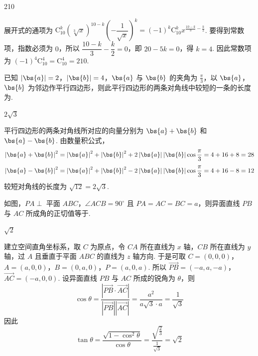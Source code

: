\begin{answer}
210
\end{answer}

\begin{solution}
展开式的通项为 \(\mathrm C_{10}^{k}\left(\sqrt[3]{x}\right)^{10-k}\left(-\dfrac{1}{\sqrt{x}}\right)^k=(-1)^k\mathrm C_{10}^{k}x^{\frac{10-k}{3}-\frac{k}{2}}\). 要得到常数项，指数必须为 \(0\)，所以 \(\dfrac{10-k}{3}-\dfrac{k}{2}=0\)，即 \(20-5k=0\)，得 \(k=4\). 因此常数项为 \((-1)^4\mathrm C_{10}^{4}=\mathrm C_{10}^{4}=210\).
\end{solution}

\begin{problem}
已知 \(\left|\bs{a}\right| = 2\)，\(\left|\bs{b}\right| = 4\)，\(\bs{a}\) 与 \(\bs{b}\) 的夹角为 \( \frac{\pi}{3} \)，以 \(\bs{a}\)，\(\bs{b}\) 为邻边作平行四边形，则此平行四边形的两条对角线中较短的一条的长度为\fillinblank{}.
\end{problem}

\begin{answer}
\(2\sqrt{3}\)
\end{answer}

\begin{solution}
平行四边形的两条对角线所对应的向量分别为 \(\bs{a}+\bs{b}\) 和 \(\bs{a}-\bs{b}\). 由数量积公式，
\[
\left|\bs{a}+\bs{b}\right|^2
=\left|\bs{a}\right|^2+\left|\bs{b}\right|^2+2\left|\bs{a}\right|\left|\bs{b}\right|\cos\frac{\pi}{3}
=4+16+8=28
\]
\[
\left|\bs{a}-\bs{b}\right|^2
=\left|\bs{a}\right|^2+\left|\bs{b}\right|^2-2\left|\bs{a}\right|\left|\bs{b}\right|\cos\frac{\pi}{3}
=4+16-8=12
\]
较短对角线的长度为 \(\sqrt{12}=2\sqrt{3}\).
\end{solution}

\begin{problem}
如图，\(PA \perp\) 平面 \(ABC\)，\(\angle ACB = 90^\circ\) 且 \(PA = AC = BC = a\)，则异面直线 \(PB\) 与 \(AC\) 所成角的正切值等于\fillinblank{}.

\end{problem}

\begin{answer}
\(\sqrt{2}\)
\end{answer}

\begin{solution}
建立空间直角坐标系，取 \(C\) 为原点，令 \(CA\) 所在直线为 \(x\) 轴，\(CB\) 所在直线为 \(y\) 轴，过 \(A\) 且垂直于平面 \(ABC\) 的直线为 \(z\) 轴方向. 于是可取
\(C=(0,0,0)\)，\(A=(a,0,0)\)，\(B=(0,a,0)\)，\(P=(a,0,a)\).
所以
\(\overrightarrow{PB}=(-a,a,-a)\)，\(\overrightarrow{AC}=(-a,0,0)\).
设异面直线 \(PB\) 与 \(AC\) 所成的锐角为 \(\theta\)，则
\[
\cos\theta
=\frac{\left|\overrightarrow{PB}\cdot\overrightarrow{AC}\right|}
{\left|\overrightarrow{PB}\right|\left|\overrightarrow{AC}\right|}
=\frac{a^2}{a\sqrt{3}\cdot a}
=\frac{1}{\sqrt{3}}
\]
因此
\[
\tan\theta=\frac{\sqrt{1-\cos^2\theta}}{\cos\theta}
=\frac{\sqrt{\frac{2}{3}}}{\frac{1}{\sqrt{3}}}
=\sqrt{2}
\]
\end{solution}

